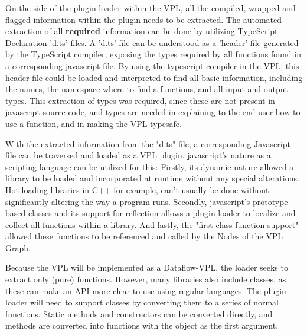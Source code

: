 


On the side of the plugin loader within the VPL, all the compiled, wrapped and flagged information within the plugin needs to be extracted. 
The automated extraction of all \textbf{required} information can be done by utilizing TypeScript Declaration 'd.ts' files. 
A 'd.ts' file can be understood as a 'header' file generated by the TypeScript compiler, exposing the types required by all functions found in a corresponding javascript file.
By using the typescript compiler in the VPL, this header file could be loaded and interpreted to find all basic information, including the names, the namespace where to find a functions, and all input and output types.
This extraction of types was required, since these are not present in javascript source code, and types are needed in explaining to the end-user how to use a function, and in making the VPL typesafe.

With the extracted information from the "d.ts" file, a corresponding Javascript file can be traversed and loaded as a VPL plugin. 
javascript's nature as a scripting language can be utilized for this:
Firstly, its dynamic nature allowed a library to be loaded and incorporated at runtime without any special alterations. 
Hot-loading libraries in C++ for example, can't usually be done without significantly altering the way a program runs. 
Secondly, javascript's prototype-based classes and its support for reflection allows a plugin loader to localize and collect all functions within a library.
And lastly, the "first-class function support" allowed these functions to be referenced and called by the Nodes of the VPL Graph. 

Because the VPL will be implemented as a Dataflow-VPL, the loader seeks to extract only (pure) functions. 
However, many libraries also include classes, as these can make an API more clear to use using regular languages. 
The plugin loader will need to support classes by converting them to a series of normal functions. 
Static methods and constructors can be converted directly, and methods are converted into functions with the object as the first argument.


